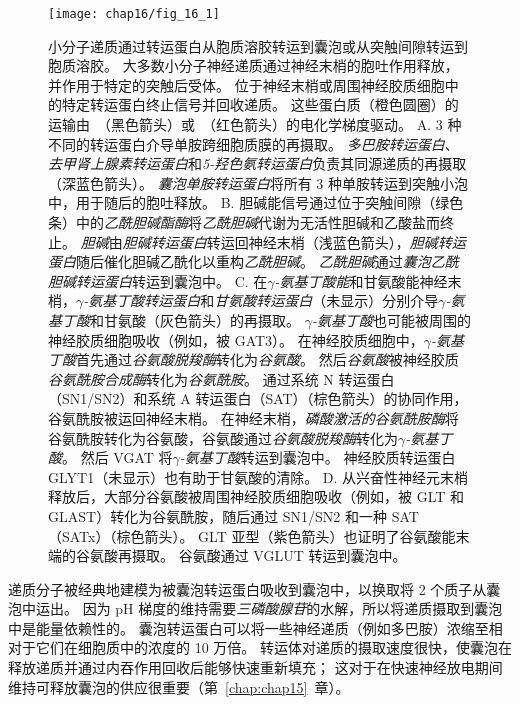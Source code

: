 \begin{figure}[htbp]
	\centering
	\texttt{[image: chap16/fig\_16\_1]}
	\caption{小分子递质通过转运蛋白从胞质溶胶转运到囊泡或从突触间隙转运到胞质溶胶。
		大多数小分子神经递质通过神经末梢的胞吐作用释放，并作用于特定的突触后受体。
		位于神经末梢或周围神经胶质细胞中的特定转运蛋白终止信号并回收递质。
		这些蛋白质（橙色圆圈）的运输由~（黑色箭头）或~（红色箭头）的电化学梯度驱动\cite{chaudhry2008pharmacology}。
		A. 3 种不同的转运蛋白介导单胺跨细胞质膜的再摄取。
		\textit{多巴胺转运蛋白}、\textit{去甲肾上腺素转运蛋白}和\textit{5-羟色氨转运蛋白}负责其同源递质的再摄取（深蓝色箭头）。
		\textit{囊泡单胺转运蛋白}将所有 3 种单胺转运到突触小泡中，用于随后的胞吐释放。
		B. 胆碱能信号通过位于突触间隙（绿色条）中的\textit{乙酰胆碱酯酶}将\textit{乙酰胆碱}代谢为无活性胆碱和乙酸盐而终止。
		\textit{胆碱}由\textit{胆碱转运蛋白}转运回神经末梢（浅蓝色箭头），\textit{胆碱转运蛋白}随后催化胆碱乙酰化以重构\textit{乙酰胆碱}。
		\textit{乙酰胆碱}通过\textit{囊泡乙酰胆碱转运蛋白}转运到囊泡中。
		C. 在\textit{$\gamma$-氨基丁酸能}和甘氨酸能神经末梢，\textit{$\gamma$-氨基丁酸转运蛋白}和\textit{甘氨酸转运蛋白}（未显示）分别介导\textit{$\gamma$-氨基丁酸}和甘氨酸（灰色箭头）的再摄取。
		\textit{$\gamma$-氨基丁酸}也可能被周围的神经胶质细胞吸收（例如，被 GAT3）。
		在神经胶质细胞中，\textit{$\gamma$-氨基丁酸}首先通过\textit{谷氨酸脱羧酶}转化为\textit{谷氨酸}。
		然后\textit{谷氨酸}被神经胶质\textit{谷氨酰胺合成酶}转化为\textit{谷氨酰胺}。
		通过系统 N 转运蛋白（SN1/SN2）和系统 A 转运蛋白（SAT）（棕色箭头）的协同作用，谷氨酰胺被运回神经末梢。
		在神经末梢，\textit{磷酸激活的谷氨酰胺酶}将谷氨酰胺转化为谷氨酸，谷氨酸通过\textit{谷氨酸脱羧酶}转化为\textit{$\gamma$-氨基丁酸}。
		然后 VGAT 将\textit{$\gamma$-氨基丁酸}转运到囊泡中。
		神经胶质转运蛋白 GLYT1（未显示）也有助于甘氨酸的清除。
		D. 从兴奋性神经元末梢释放后，大部分谷氨酸被周围神经胶质细胞吸收（例如，被 GLT 和 GLAST）转化为谷氨酰胺，随后通过 SN1/SN2 和一种 SAT（SATx）（棕色箭头）。
		GLT 亚型（紫色箭头）也证明了谷氨酸能末端的谷氨酸再摄取。 谷氨酸通过 VGLUT 转运到囊泡中。}
	\label{fig:16_1}
\end{figure}


递质分子被经典地建模为被囊泡转运蛋白吸收到囊泡中，以换取将 2 个质子从囊泡中运出。
因为 pH 梯度的维持需要\textit{三磷酸腺苷}的水解，所以将递质摄取到囊泡中是能量依赖性的。
囊泡转运蛋白可以将一些神经递质（例如多巴胺）浓缩至相对于它们在细胞质中的浓度的 10 万倍。
转运体对递质的摄取速度很快，使囊泡在释放递质并通过内吞作用回收后能够快速重新填充；
这对于在快速神经放电期间维持可释放囊泡的供应很重要（第~\ref{chap:chap15}~章）。


